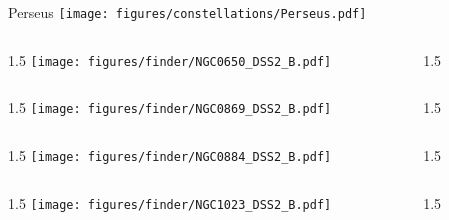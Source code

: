 \documentclass[final]{beamer}
\newlength{\colwidth}
\begin{document}

\begin{frame}[t]{\LARGE Perseus}
  \centering
  \texttt{[image: figures/constellations/Perseus.pdf]}
\end{frame}


\begin{frame}[t]{}
  \begin{columns}[T]
    \begin{column}{1.5\colwidth}
      \centering
      \texttt{[image: figures/finder/NGC0650\_DSS2\_B.pdf]}
    \end{column}
    \begin{column}{1.5\colwidth}
      \Large
      
    \end{column}
  \end{columns}
  \vspace{\fill}
  \begin{columns}[T]
    \begin{column}{1.5\colwidth}
      \centering
      \texttt{[image: figures/finder/NGC0869\_DSS2\_B.pdf]}
    \end{column}
    \begin{column}{1.5\colwidth}
      \Large
      
    \end{column}
  \end{columns}
\end{frame}

\begin{frame}[t]{}
  \begin{columns}[T]
    \begin{column}{1.5\colwidth}
      \centering
      \texttt{[image: figures/finder/NGC0884\_DSS2\_B.pdf]}
    \end{column}
    \begin{column}{1.5\colwidth}
      \Large
      
    \end{column}
  \end{columns}
  \vspace{\fill}
  \begin{columns}[T]
    \begin{column}{1.5\colwidth}
      \centering
      \texttt{[image: figures/finder/NGC1023\_DSS2\_B.pdf]}
    \end{column}
    \begin{column}{1.5\colwidth}
      \Large
      
    \end{column}
  \end{columns}
\end{frame}
\end{document}
